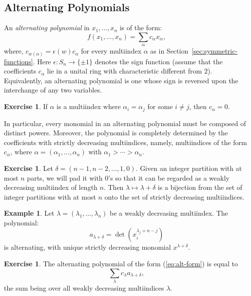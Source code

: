 \documentclass[11pt]{amsproc}
\theoremstyle{definition}
\theoremstyle{example}
\newtheorem{example}[theorem]{Example}
\newtheorem{exercise}[theorem]{Exercise}
\begin{document}
\subsection{Alternating Polynomials}
\label{sec:alt-poly}
An \emph{alternating polynomial} in $x_1,\dotsc, x_n$ is of the form:
\begin{equation}
  \label{eq:alt-form}
  f(x_1,\dotsc,x_n) = \sum_{\alpha} c_\alpha x_\alpha,
\end{equation}
where, $c_{w(\alpha)} = \epsilon(w)c_\alpha$ for every multiindex $\alpha$ as in Section~\ref{sec:symmetric-functions}.
Here $\epsilon:S_n\to \{\pm 1\}$ denotes the sign function (assume that the coefficients $c_\alpha$ lie in a unital ring with characteristic different from $2$).
Equivalently, an alternating polynomial is one whose sign is reversed upon the interchange of any two variables.
\begin{exercise}
  If $\alpha$ is a multiindex where $\alpha_i=\alpha_j$ for some $i\neq j$, then $c_\alpha = 0$.
\end{exercise}
In particular, every monomial in an alternating polynomial must be composed of distinct powers.
Moreover, the polynomial is completely determined by the coefficients with strictly decreasing multiindices, namely, multiindices of the form $c_\alpha$, where $\alpha=(\alpha_1,\dotsc,\alpha_n)$ with $\alpha_1>\dotsb>\alpha_n$.
\begin{exercise}
  Let $\delta=(n-1,n-2,\dotsc,1, 0)$.
  Given an integer partition with at most $n$ parts, we will pad it with $0$'s so that it can be regarded as a weakly decreasing multiindex of length $n$.
  Then $\lambda\mapsto \lambda+\delta$ is a bijection from the set of integer partitions with at most $n$ onto the set of strictly decreasing multiindices.
\end{exercise}
\begin{example}
  Let $\lambda = (\lambda_1,\dotsc, \lambda_n)$ be a weakly decreasing multiindex.
  The polynomial:
  \begin{displaymath}
    a_{\lambda+\delta} = \det(x_i^{\lambda_j + n - j})
  \end{displaymath}
  is alternating, with unique strictly decreasing monomial $x^{\lambda+\delta}$.
\end{example}
\begin{exercise}
  \label{exercise:alt-basis}
  The alternating polynomial of the form \textup{(\ref{eq:alt-form})} is equal to  \begin{displaymath}
    \sum_{\lambda} c_\lambda a_{\lambda+\delta},
  \end{displaymath}
  the sum being over all weakly decreasing multiindices $\lambda$.
\end{exercise}
\end{document}
